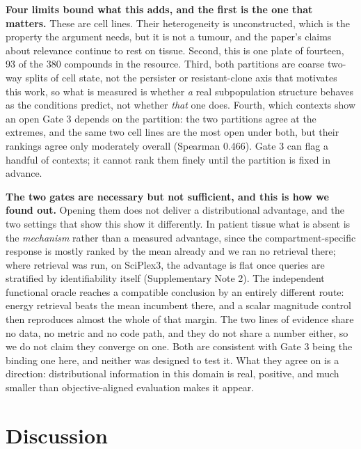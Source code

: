 \documentclass[11pt,letterpaper]{article}
\newcommand{\TAHOEPARTAGREE}{0.466}
\begin{document}
\textbf{Four limits bound what this adds, and the first is the one that matters.} These are cell
lines. Their heterogeneity is unconstructed, which is the property the argument needs, but it is
not a tumour, and the paper's claims about relevance continue to rest on tissue. Second, this is
one plate of fourteen, 93 of the 380 compounds in the resource. Third, both partitions are coarse
two-way splits of cell state, not the persister or resistant-clone axis that motivates this work,
so what is measured is whether \emph{a} real subpopulation structure behaves as the conditions
predict, not whether \emph{that} one does. Fourth, which contexts show an open Gate 3 depends on
the partition: the two partitions agree at the extremes, and the same two cell lines are the most
open under both, but their rankings agree only moderately overall (Spearman \TAHOEPARTAGREE{}).
Gate 3 can flag a handful of contexts; it cannot rank them finely until the partition is fixed in
advance.

\textbf{The two gates are necessary but not sufficient, and this is how we found out.} Opening them
does not deliver a distributional advantage, and the two settings that show this show it
differently. In patient tissue what is absent is the \emph{mechanism} rather than a measured
advantage, since the compartment-specific response is mostly ranked by the mean already and we ran
no retrieval there; where retrieval was run, on SciPlex3, the advantage is flat once queries are
stratified by identifiability itself (Supplementary Note 2). The independent functional oracle reaches a
compatible conclusion by an entirely different route: energy retrieval beats the mean incumbent
there, and a scalar magnitude control then reproduces almost the whole of that margin. The two
lines of evidence share no data, no metric and no code path, and they do not share a number
either, so we do not claim they converge on one. Both are consistent with Gate 3 being the binding
one here, and neither was designed to test it. What they agree on is a direction: distributional
information in this domain is real, positive, and much smaller than objective-aligned evaluation
makes it appear.


\section*{Discussion}
\end{document}
